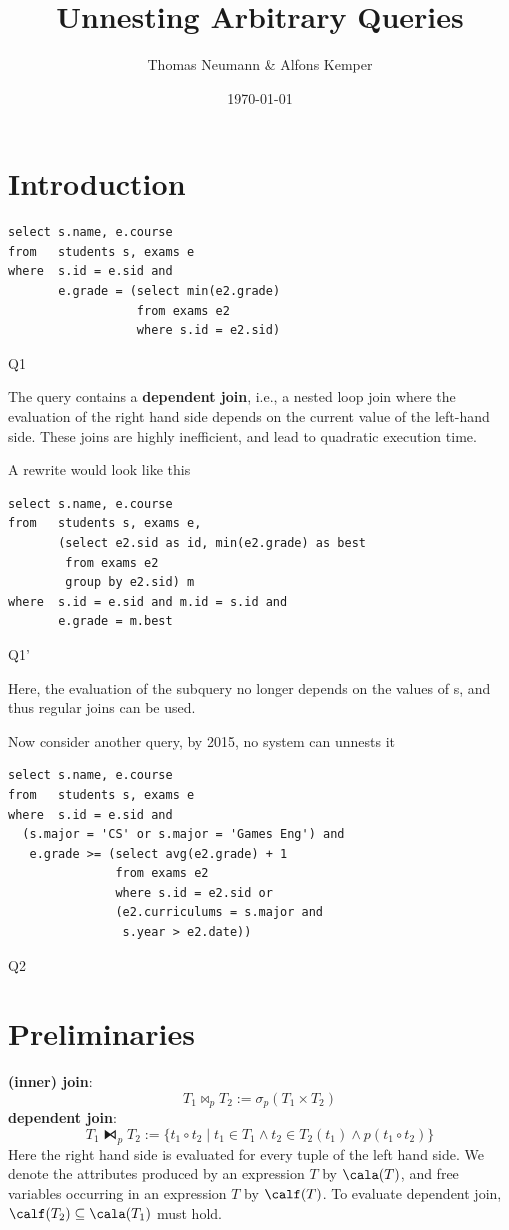 \documentclass[11pt]{article}
\author{Thomas Neumann \& Alfons Kemper}
\date{\today}
\title{Unnesting Arbitrary Queries}
\begin{document}
\maketitle
\section{Introduction}
\label{sec:orgb7f8077}
\begin{listing}[htbp]
\begin{verbatim}
select s.name, e.course
from   students s, exams e
where  s.id = e.sid and
       e.grade = (select min(e2.grade)
                  from exams e2
                  where s.id = e2.sid)
\end{verbatim}
\caption{Q1}
\end{listing}
The query contains a \textbf{dependent join}, i.e., a nested loop join where the evaluation of the right hand
side depends on the current value of the left-hand side. These joins are highly inefficient, and lead
to quadratic execution time.

A rewrite would look like this
\begin{listing}[htbp]
\begin{verbatim}
select s.name, e.course
from   students s, exams e,
       (select e2.sid as id, min(e2.grade) as best
        from exams e2
        group by e2.sid) m
where  s.id = e.sid and m.id = s.id and
       e.grade = m.best
\end{verbatim}
\caption{Q1'}
\end{listing}
Here, the evaluation of the subquery no longer depends on the values of s, and thus regular joins can
be used.

Now consider another query, by 2015, no system can unnests it
\begin{listing}[htbp]
\begin{verbatim}
select s.name, e.course
from   students s, exams e
where  s.id = e.sid and
  (s.major = 'CS' or s.major = 'Games Eng') and
   e.grade >= (select avg(e2.grade) + 1
               from exams e2
               where s.id = e2.sid or
               (e2.curriculums = s.major and
                s.year > e2.date))
\end{verbatim}
\caption{Q2}
\end{listing}
\section{Preliminaries}
\label{sec:org96ca1f9}
\textbf{(inner) join}:
\begin{equation*}
T_1\bowtie_p T_2:=\sigma_p(T_1\times T_2)
\end{equation*}
\textbf{dependent join}:
\begin{equation*}
T_1\lfbowtie_p T_2:=\{t_1\circ t_2\mid t_1\in T_1\wedge t_2\in T_2(t_1)\wedge p(t_1\circ t_2)\}
\end{equation*}
Here the right hand side is evaluated for every tuple of the left hand side. We denote the attributes
produced by an expression \(T\) by \(\cala(T)\), and free variables occurring in an expression \(T\)
by \(\calf(T)\). To evaluate dependent join, \(\calf(T_2)\subseteq \cala(T_1)\) must hold.
\end{document}

